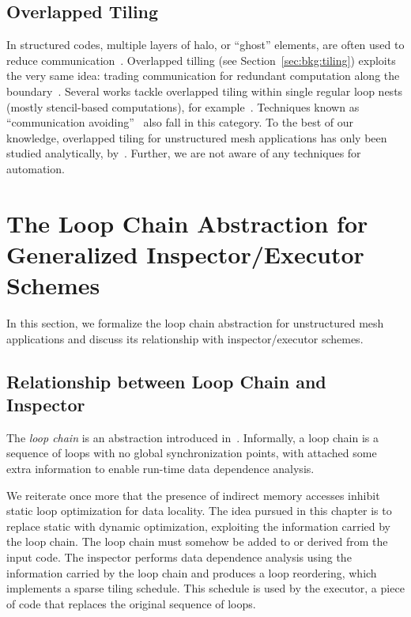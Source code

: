 \subsection*{Overlapped Tiling}
In structured codes, multiple layers of halo, or ``ghost'' elements, are often used to reduce communication~\citep{Bassetti98}. Overlapped tilling (see Section~\ref{sec:bkg:tiling}) exploits the very same idea: trading communication for redundant computation along the boundary~\citep{Zhou12}. Several works tackle overlapped tiling within single regular loop nests (mostly stencil-based computations), for example~\cite{Meng09,Krishnamoorthy07,Chen02}. Techniques known as ``communication avoiding''~\citep{ST-Demmel08,ST-commAvoidingSparse2009} also fall in this category. To the best of our knowledge, overlapped tiling for unstructured mesh applications has only been studied analytically, by~\cite{gihan-overlapped}. Further, we are not aware of any techniques for automation.



\section{The Loop Chain Abstraction for Generalized Inspector/Executor Schemes}
\label{sec:tiling:lc}
In this section, we formalize the loop chain abstraction for unstructured mesh applications and discuss its relationship with inspector/executor schemes.

\subsection{Relationship between Loop Chain and Inspector}
The \textit{loop chain} is an abstraction introduced in~\cite{ST-KriegerHIPS2013}. Informally, a loop chain is a sequence of loops with no global synchronization points, with attached some extra information to enable run-time data dependence analysis. 

We reiterate once more that the presence of indirect memory accesses inhibit static loop optimization for data locality. The idea pursued in this chapter is to replace static with dynamic optimization, exploiting the information carried by the loop chain. The loop chain must somehow be added to or derived from the input code. The inspector performs data dependence analysis using the information carried by the loop chain and produces a loop reordering, which implements a sparse tiling schedule. This schedule is used by the executor, a piece of code that replaces the original sequence of loops.

